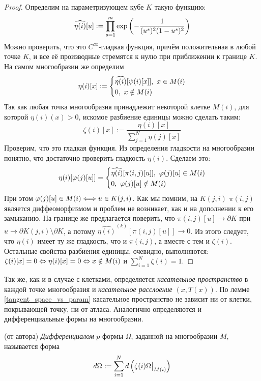 \begin{proof}
	Определим на параметризующем кубе $K$ такую функцию:
	\[
		\widehat{\eta(i)}[u] := \prod_{s=1}^m \exp\left(-\frac{1}{(u^s)^2 (1-u^s)^2}\right)
	\]
	Можно проверить, что это $C^\infty$-гладкая функция, причём положительная в любой точке $K$, и все её производные стремятся к нулю при приближении к границе $K$. На самом многообразии же определим
	\[
		\eta(i)[x] := \left\{\begin{aligned}
		&{\widehat{\eta(i)}[\psi(i)[x]], \ x \in M(i)}
		\\
		&{0, \ x \notin M(i)}\end{aligned}\right.
	\]
	Так как любая точка многообразия принадлежит некоторой клетке $M(i)$, для которой $\eta(i)(x) > 0$, искомое разбиение единицы можно сделать таким:
	\[
		\zeta(i)[x] := \frac {\eta(i)[x]} {\sum\limits_{j=1}^N \eta(j)[x]}
	\]
	Проверим, что это гладкая функция. Из определения гладкости на многообразии понятно, что достаточно проверить гладкость $\eta(i)$. Сделаем это:
	\[
		\eta(i)[\varphi(j)[u]] = \left\{\begin{aligned}
		&{ \widehat{\eta(i)}[\pi(i,j)[u]], \ \varphi(j)[u] \in M(i)}
		\\
		&{0, \ \varphi(j)[u] \notin M(i)}\end{aligned}\right.
	\]
	При этом $\varphi(j)[u] \in M(i) \Longleftrightarrow u \in K(j,i)$. Как мы помним, на $K(j,i)$ $\pi(i,j)$ является диффеоморфизмом и проблем не возникает, как и на дополнении к его замыканию. На границе же предлагается поверить, что $\pi(i,j)[u] \to \partial K$ при $u \to \partial K(j,i) \setminus \partial K$, а потому $\widehat{\eta(i)}^{(k)}[\pi(i,j)[u]] \to 0$. Из этого следует, что $\eta(i)$ имеет ту же гладкость, что и $\pi(i,j)$, а вместе с тем и $\zeta(i)$.	Остальные свойства разбиения единицы, очевидно, выполняются: $\zeta(i)[x] = 0 \Leftrightarrow \eta(i)[x] = 0 \Leftrightarrow x \notin M(i)$ и $\sum_{i=1}^N \zeta(i) = 1$.
\end{proof}

\begin{note}
	Так же, как и в случае с клетками, определяется \textit{касательное пространство} в каждой точке многообразия и \textit{касательное расслоение} $(x, T(x))$. По лемме \ref{tangent_space_vs_param} касательное пространство не зависит ни от клетки, покрывающей точку, ни от атласа. Аналогично определяются и дифференциальные формы на многообразии.
\end{note}

\begin{definition} (от автора)
	\textit{Дифференциалом} $p$-формы $\Omega$, заданной на многообразии $M$, называется форма
	\[
		d\Omega := \sum_{i=1}^N  d\left(\zeta(i) \Omega\big|_{M(i)}\right)
	\]
\end{definition}


